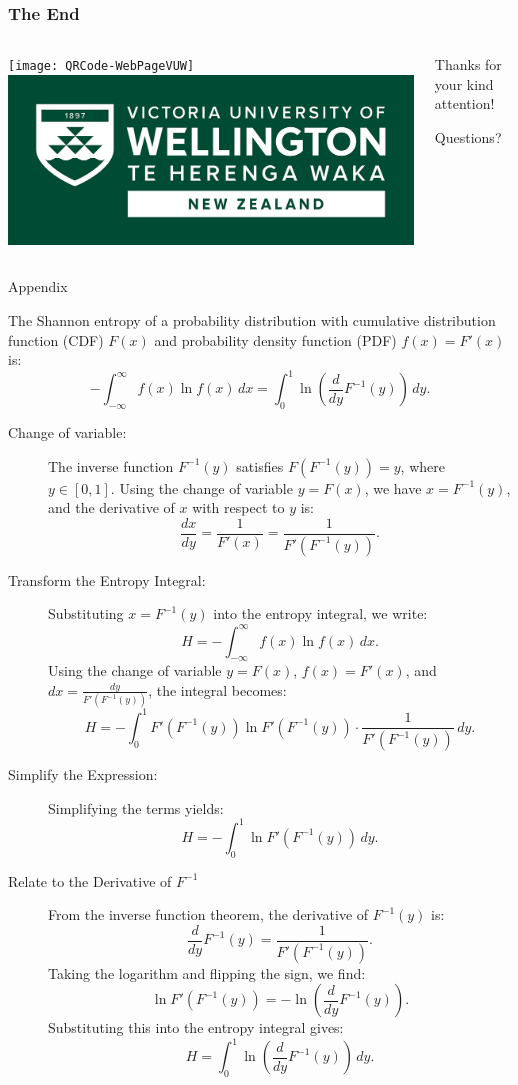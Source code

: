 \documentclass[table,aspectratio=169]{beamer}
\begin{document}
\begin{frame}[standout]
\frametitle{The End}
\begin{columns}
	\begin{column}{.4\linewidth}
		\centering
		\texttt{[image: QRCode-WebPageVUW]}\\	\includegraphics[width=\linewidth]{"Logo Offshore Reversed Landscape RGB"}
	\end{column}
	\begin{column}{.6\linewidth}
		Thanks for your kind attention!
		
		Questions?
	\end{column}
\end{columns}
\end{frame}

\begin{frame}[allowframebreaks]{Appendix}\label{App:Proof}

	The Shannon entropy of a probability distribution with cumulative distribution function (CDF) \( F(x) \) and probability density function (PDF) \( f(x) = F'(x) \) is:
	\[
-\int_{-\infty}^\infty f(x) \ln f(x) \, dx = \int_0^1 \ln \left( \frac{d}{dy} F^{-1}(y) \right) \, dy.
	\]

\begin{description}
	\item[Change of variable:]	The inverse function \( F^{-1}(y) \) satisfies \( F(F^{-1}(y)) = y \), where \( y \in [0, 1] \). Using the change of variable \( y = F(x) \), we have \( x = F^{-1}(y) \), and the derivative of \( x \) with respect to \( y \) is:
	\[
	\frac{dx}{dy} = \frac{1}{F'(x)} = \frac{1}{F'(F^{-1}(y))}.
	\]
	\item[Transform the Entropy Integral:] 	Substituting \( x = F^{-1}(y) \) into the entropy integral, we write:
	\[
	H = -\int_{-\infty}^\infty f(x) \ln f(x) \, dx.
	\]
	Using the change of variable \( y = F(x) \), \( f(x) = F'(x) \), and \( dx = \frac{dy}{F'(F^{-1}(y))} \), the integral becomes:
	\[
	H = -\int_0^1 F'(F^{-1}(y)) \ln F'(F^{-1}(y)) \cdot \frac{1}{F'(F^{-1}(y))} \, dy.
	\]
	\item[Simplify the Expression:] 	Simplifying the terms yields:
	\[
	H = -\int_0^1 \ln F'(F^{-1}(y)) \, dy.
	\]
	\item[Relate to the Derivative of \( F^{-1} \)] 	From the inverse function theorem, the derivative of \( F^{-1}(y) \) is:
	\[
	\frac{d}{dy} F^{-1}(y) = \frac{1}{F'(F^{-1}(y))}.
	\]
	Taking the logarithm and flipping the sign, we find:
	\[
	\ln F'(F^{-1}(y)) = -\ln \left( \frac{d}{dy} F^{-1}(y) \right).
	\]
	Substituting this into the entropy integral gives:
	\[
	H = \int_0^1 \ln \left( \frac{d}{dy} F^{-1}(y) \right) \, dy.
	\] 
\end{description}	
\end{frame}
\end{document}
